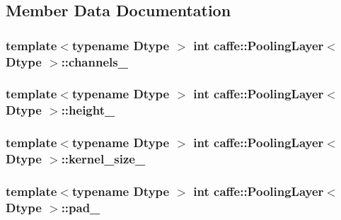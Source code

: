 \subsection{Member Data Documentation}
\hypertarget{classcaffe_1_1_pooling_layer_a9aaf4e65127d969b32b1a860dcb380f4}{
\subsubsection[{channels\+\_\+}]{\setlength{\rightskip}{0pt plus 5cm}template$<$typename Dtype $>$ int {\bf caffe\+::\+Pooling\+Layer}$<$ Dtype $>$\+::channels\+\_\+\hspace{0.3cm}{\ttfamily [protected]}}}\label{classcaffe_1_1_pooling_layer_a9aaf4e65127d969b32b1a860dcb380f4}
\hypertarget{classcaffe_1_1_pooling_layer_a58ef04bbd1ee89201b07f99329538e95}{
\subsubsection[{height\+\_\+}]{\setlength{\rightskip}{0pt plus 5cm}template$<$typename Dtype $>$ int {\bf caffe\+::\+Pooling\+Layer}$<$ Dtype $>$\+::height\+\_\+\hspace{0.3cm}{\ttfamily [protected]}}}\label{classcaffe_1_1_pooling_layer_a58ef04bbd1ee89201b07f99329538e95}
\hypertarget{classcaffe_1_1_pooling_layer_a93e497a4fe4888f74dec455b7b030cb1}{
\subsubsection[{kernel\+\_\+size\+\_\+}]{\setlength{\rightskip}{0pt plus 5cm}template$<$typename Dtype $>$ int {\bf caffe\+::\+Pooling\+Layer}$<$ Dtype $>$\+::kernel\+\_\+size\+\_\+\hspace{0.3cm}{\ttfamily [protected]}}}\label{classcaffe_1_1_pooling_layer_a93e497a4fe4888f74dec455b7b030cb1}
\hypertarget{classcaffe_1_1_pooling_layer_a9427e9a29b2b573ac8b34501344d0540}{
\subsubsection[{pad\+\_\+}]{\setlength{\rightskip}{0pt plus 5cm}template$<$typename Dtype $>$ int {\bf caffe\+::\+Pooling\+Layer}$<$ Dtype $>$\+::pad\+\_\+\hspace{0.3cm}{\ttfamily [protected]}}}\label{classcaffe_1_1_pooling_layer_a9427e9a29b2b573ac8b34501344d0540}

